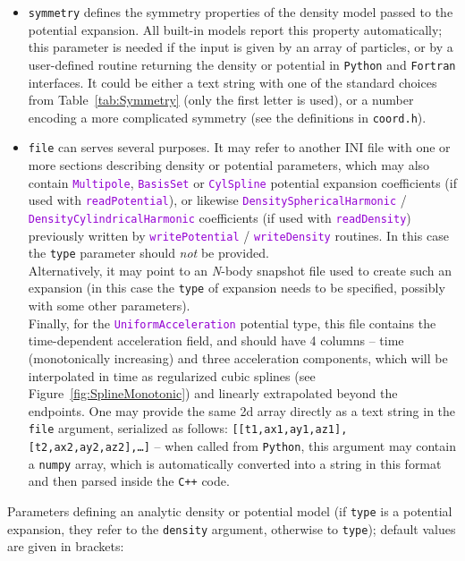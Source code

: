 \documentclass[12pt]{article}
\newcommand{\Nbody}{\textsl{N}-body\xspace}
\newcommand{\Cpp}  {\texttt{C++}\xspace}
\newcommand{\Python}{\texttt{Python}\xspace}
\newcommand{\Fortran}{\texttt{Fortran}\xspace}
\newcommand{\ttt}[1]{\textcolor{darkviolet}{\texttt{#1}}}
\newcommand{\ppp}[1]{\textcolor{darkolive} {\texttt{#1}}}
\begin{document}
\begin{itemize}
\item \ppp{symmetry}  defines the symmetry properties of the density model passed to the potential expansion. All built-in models report this property automatically; this parameter is needed if the input is given by an array of particles, or by a user-defined routine returning the density or potential in \Python and \Fortran interfaces. It could be either a text string with one of the standard choices from Table~\ref{tab:Symmetry} (only the first letter is used), or a number encoding a more complicated symmetry (see the definitions in \texttt{coord.h}).
\item \ppp{file} can serves several purposes. It may refer to another INI file with one or more sections describing density or potential parameters, which may also contain \ttt{Multipole}, \ttt{BasisSet} or \ttt{CylSpline} potential expansion coefficients (if used with \ttt{readPotential}), or likewise \ttt{DensitySphericalHarmonic} / \ttt{DensityCylindricalHarmonic} coefficients (if used with \ttt{readDensity}) previously written by \ttt{writePotential} / \ttt{writeDensity} routines. In this case the \ppp{type} parameter should \emph{not} be provided.\\ Alternatively, it may point to an \Nbody snapshot file used to create such an expansion (in this case the \ppp{type} of expansion needs to be specified, possibly with some other parameters).\\ Finally, for the \ttt{UniformAcceleration} potential type, this file contains the time-dependent acceleration field, and should have 4 columns -- time (monotonically increasing) and three acceleration components, which will be interpolated in time as regularized cubic splines (see Figure~\ref{fig:SplineMonotonic}) and linearly extrapolated beyond the endpoints.  One may provide the same 2d array directly as a text string in the \ppp{file} argument, serialized as follows: \texttt{[[t1,ax1,ay1,az1],[t2,ax2,ay2,az2],\dots]} -- when called from \Python, this argument may contain a \texttt{numpy} array, which is automatically converted into a string in this format and then parsed inside the \Cpp code.
\end{itemize}
Parameters defining an analytic density or potential model (if \ppp{type} is a potential expansion, they refer to the \ppp{density} argument, otherwise to \ppp{type}); default values are given in brackets:
\end{document}
